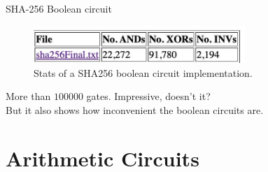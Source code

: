 \documentclass{beamer}
\begin{document}
    \begin{frame}{SHA-256 Boolean circuit}
        \begin{figure}[h!]
            \centering
            \includegraphics[width=8cm]{../presentations/images/lecture_8/sha256booleancircuit.jpg}
            \vspace{-10pt}  %
            \caption{Stats of a SHA256 boolean circuit implementation.}
        \end{figure}
        More than $100000$ gates. Impressive, doesn't it? \\
        \vspace{5pt }
        But it also shows how inconvenient the boolean circuits are. 
    \end{frame}

    \section{Arithmetic Circuits}
\end{document}
